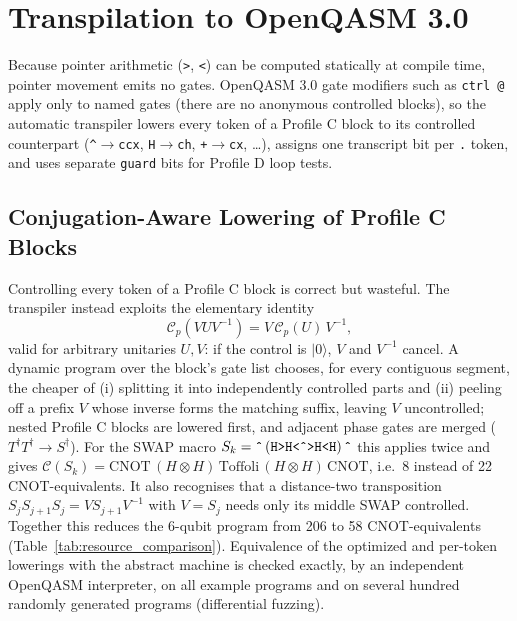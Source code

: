 \documentclass[11pt,a4paper,twocolumn]{article}
\newcommand{\ket}[1]{| #1 \rangle}
\begin{document}
\section{Transpilation to OpenQASM 3.0}

Because pointer arithmetic (\texttt{>}, \texttt{<}) can be computed statically at compile time, pointer movement emits no gates. OpenQASM 3.0 gate modifiers such as \texttt{ctrl @} apply only to named gates (there are no anonymous controlled blocks), so the automatic transpiler lowers every token of a Profile C block to its controlled counterpart (\texttt{\^{}}$\to$\texttt{ccx}, \texttt{H}$\to$\texttt{ch}, \texttt{+}$\to$\texttt{cx}, \dots), assigns one transcript bit per \texttt{.} token, and uses separate \texttt{guard} bits for Profile D loop tests.

\subsection{Conjugation-Aware Lowering of Profile C Blocks}
\label{sec:conj}
Controlling every token of a Profile C block is correct but wasteful. The transpiler instead exploits the elementary identity
\begin{equation}
    \mathcal{C}_p\!\left(V U V^{-1}\right) = V \, \mathcal{C}_p(U) \, V^{-1},
\end{equation}
valid for arbitrary unitaries $U, V$: if the control is $\ket{0}$, $V$ and $V^{-1}$ cancel. A dynamic program over the block's gate list chooses, for every contiguous segment, the cheaper of (i) splitting it into independently controlled parts and (ii) peeling off a prefix $V$ whose inverse forms the matching suffix, leaving $V$ uncontrolled; nested Profile C blocks are lowered first, and adjacent phase gates are merged ($T^\dagger T^\dagger \to S^\dagger$). For the SWAP macro $S_k = \texttt{\^{}}\,(\texttt{H>H<\^{}>H<H})\,\texttt{\^{}}$ this applies twice and gives $\mathcal{C}(S_k) = \text{CNOT}\,(H \otimes H)\,\text{Toffoli}\,(H \otimes H)\,\text{CNOT}$, i.e.\ 8 instead of 22 CNOT-equivalents. It also recognises that a distance-two transposition $S_j S_{j+1} S_j = V S_{j+1} V^{-1}$ with $V = S_j$ needs only its middle SWAP controlled. Together this reduces the 6-qubit program from 206 to 58 CNOT-equivalents (Table~\ref{tab:resource_comparison}). Equivalence of the optimized and per-token lowerings with the abstract machine is checked exactly, by an independent OpenQASM interpreter, on all example programs and on several hundred randomly generated programs (differential fuzzing).
\end{document}
